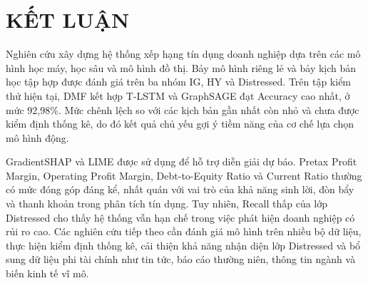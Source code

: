 \documentclass[10pt,twoside]{article}
\begin{document}
\section{KẾT LUẬN}
Nghiên cứu xây dựng hệ thống xếp hạng tín dụng doanh nghiệp dựa trên các mô hình học máy, học sâu và mô hình đồ thị. Bảy mô hình riêng lẻ và bảy kịch bản học tập hợp được đánh giá trên ba nhóm IG, HY và Distressed. Trên tập kiểm thử hiện tại, DMF kết hợp T-LSTM và GraphSAGE đạt Accuracy cao nhất, ở mức 92,98\%. Mức chênh lệch so với các kịch bản gần nhất còn nhỏ và chưa được kiểm định thống kê, do đó kết quả chủ yếu gợi ý tiềm năng của cơ chế lựa chọn mô hình động.

GradientSHAP và LIME được sử dụng để hỗ trợ diễn giải dự báo. Pretax Profit Margin, Operating Profit Margin, Debt-to-Equity Ratio và Current Ratio thường có mức đóng góp đáng kể, nhất quán với vai trò của khả năng sinh lời, đòn bẩy và thanh khoản trong phân tích tín dụng. Tuy nhiên, Recall thấp của lớp Distressed cho thấy hệ thống vẫn hạn chế trong việc phát hiện doanh nghiệp có rủi ro cao. Các nghiên cứu tiếp theo cần đánh giá mô hình trên nhiều bộ dữ liệu, thực hiện kiểm định thống kê, cải thiện khả năng nhận diện lớp Distressed và bổ sung dữ liệu phi tài chính như tin tức, báo cáo thường niên, thông tin ngành và biến kinh tế vĩ mô.




\end{document}
